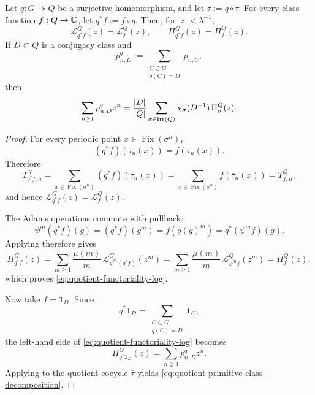 \begin{theorem}
  \label{thm:quotient-functoriality}
  Let \(q:G\twoheadrightarrow Q\) be a surjective homomorphism, and let
  \(\bar\tau:=q\circ\tau\). For every class function \(f:Q\to\mathbb{C}\), let
  \(q^\ast f:=f\circ q\). Then, for \(|z|<\lambda^{-1}\),
  \begin{equation}\label{eq:quotient-functoriality-log}
    \mathcal L_{q^\ast f}^{G}(z)=\mathcal L_f^{Q}(z),
    \qquad
    \Pi_{q^\ast f}^{G}(z)=\Pi_f^{Q}(z).
  \end{equation}
  If \(D\subset Q\) is a conjugacy class and
  \[
    p^q_{n,D}:=\sum_{\substack{C\subset G\\ q(C)=D}}p_{n,C},
  \]
  then
  \begin{equation}\label{eq:quotient-primitive-class-decomposition}
    \sum_{n\ge 1}p^q_{n,D}z^n
    =
    \frac{|D|}{|Q|}
      \sum_{\sigma\in\operatorname{Irr}(Q)}
        \chi_\sigma(D^{-1})\,\Pi_\sigma^{Q}(z).
  \end{equation}
\end{theorem}

\begin{proof}
  For every periodic point \(x\in\operatorname{Fix}(\sigma^n)\),
  \[
    (q^\ast f)(\tau_n(x))=f(\bar\tau_n(x)).
  \]
  Therefore
  \[
    T^{G}_{q^\ast f,n}
    =
    \sum_{x\in\operatorname{Fix}(\sigma^n)}(q^\ast f)(\tau_n(x))
    =
    \sum_{x\in\operatorname{Fix}(\sigma^n)}f(\bar\tau_n(x))
    =T^{Q}_{f,n},
  \]
  and hence \(\mathcal L_{q^\ast f}^{G}(z)=\mathcal L_f^{Q}(z)\).

  The Adams operations commute with pullback:
  \[
    \psi^m(q^\ast f)(g)
    =(q^\ast f)(g^m)
    =f(q(g)^m)
    =q^\ast(\psi^m f)(g).
  \]
  Applying  therefore gives
  \[
    \Pi_{q^\ast f}^{G}(z)
    =
    \sum_{m\ge 1}\frac{\mu(m)}{m}\,
      \mathcal L_{\psi^m(q^\ast f)}^{G}(z^m)
    =
    \sum_{m\ge 1}\frac{\mu(m)}{m}\,
      \mathcal L_{\psi^m f}^{Q}(z^m)
    =\Pi_f^{Q}(z),
  \]
  which proves \eqref{eq:quotient-functoriality-log}.

  Now take \(f=\mathbf 1_D\). Since
  \[
    q^\ast\mathbf 1_D=\sum_{\substack{C\subset G\\ q(C)=D}}\mathbf 1_C,
  \]
  the left-hand side of \eqref{eq:quotient-functoriality-log} becomes
  \[
    \Pi_{q^\ast\mathbf 1_D}^{G}(z)
    =
    \sum_{n\ge 1}p^q_{n,D}z^n.
  \]
  Applying  to the quotient
  cocycle \(\bar\tau\) yields
  \eqref{eq:quotient-primitive-class-decomposition}.
\end{proof}

